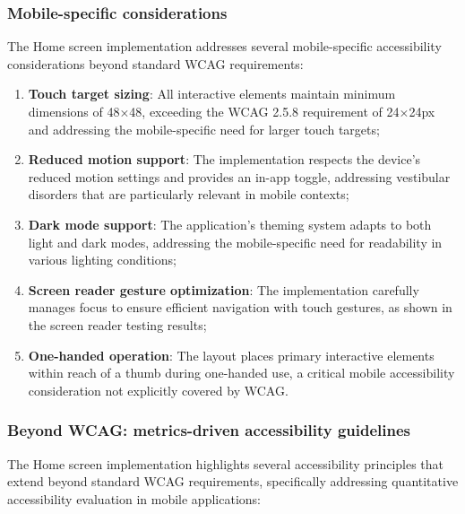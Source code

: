 \subsubsection{Mobile-specific considerations}

The Home screen implementation addresses several mobile-specific accessibility considerations beyond standard WCAG requirements:

\begin{enumerate}
    \item \textbf{Touch target sizing}: All interactive elements maintain minimum dimensions of 48×48, exceeding the WCAG 2.5.8 requirement of 24×24px and addressing the mobile-specific need for larger touch targets;
    \item \textbf{Reduced motion support}: The implementation respects the device's reduced motion settings and provides an in-app toggle, addressing vestibular disorders that are particularly relevant in mobile contexts;
    \item \textbf{Dark mode support}: The application's theming system adapts to both light and dark modes, addressing the mobile-specific need for readability in various lighting conditions;
    \item \textbf{Screen reader gesture optimization}: The implementation carefully manages focus to ensure efficient navigation with touch gestures, as shown in the screen reader testing results;
    \item \textbf{One-handed operation}: The layout places primary interactive elements within reach of a thumb during one-handed use, a critical mobile accessibility consideration not explicitly covered by WCAG.
\end{enumerate}

\subsubsection{Beyond WCAG: metrics-driven accessibility guidelines}

The Home screen implementation highlights several accessibility principles that extend beyond standard WCAG requirements, specifically addressing quantitative accessibility evaluation in mobile applications:

